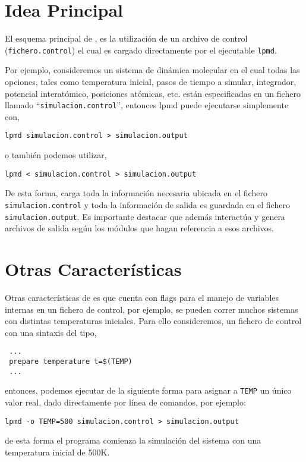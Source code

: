 \section{Idea Principal}

El esquema principal de {\lpmd}, es la utilizaci\'on de un archivo de control (\verb|fichero.control|) el cual es cargado directamente por el ejecutable \verb|lpmd|.

Por ejemplo, consideremos un sistema de din\'amica molecular en el cual todas las opciones, tales como temperatura inicial, pasos de tiempo a simular, integrador, potencial interat\'omico, posiciones at\'omicas, etc. est\'an especificadas en un fichero llamado ``\verb|simulacion.control|'', entonces lpmd puede ejecutarse simplemente con,

\begin{center}
 \texttt{lpmd simulacion.control > simulacion.output}
\end{center}
\noindent
o tambi\'en podemos utilizar,

\begin{center}
 \texttt{lpmd < simulacion.control > simulacion.output}
\end{center}

De esta forma, {\lpmd} carga toda la informaci\'on necesaria ubicada en el fichero \verb|simulacion.control| y toda la informaci\'on de salida es guardada en el fichero \verb|simulacion.output|. Es importante destacar que {\lpmd} adem\'as interact\'ua y genera archivos de salida seg\'un los m\'odulos que hagan referencia a esos archivos.

\section{Otras Caracter\'isticas}

Otras caracter\'isticas de {\lpmd} es que cuenta con flags para el manejo de variables internas en un fichero de control, por ejemplo, se pueden correr muchos sistemas con distintas temperaturas iniciales. Para ello consideremos, un fichero de control con una sintaxis del tipo,

\begin{verbatim}
 ...
 prepare temperature t=$(TEMP)
 ...
\end{verbatim}
\noindent
entonces, podemos ejecutar {\lpmd} de la siguiente forma para asignar a \verb|TEMP| un \'unico valor real, dado directamente por l\'inea de comandos, por ejemplo:

\begin{center}
 \texttt{lpmd -o TEMP=500 simulacion.control > simulacion.output}
\end{center}
\noindent
de esta forma el programa comienza la simulaci\'on del sistema con una temperatura inicial de 500K. 

